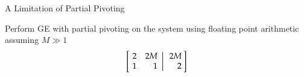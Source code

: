 \documentclass[10pt]{beamer}
\begin{document}
\begin{frame}{A Limitation of Partial Pivoting}
\begin{itemize}
\begin{example}    
Perform GE with partial pivoting on the system using floating point arithmetic assuming $M\gg1$  
    \begin{equation*}
        \left[\left.\negthickspace\begin{array}{rr}  2 &  2M\\
                                                        1 &  1\end{array}
               \right|\begin{array}{r} 2M \\ 2\end{array}\negthickspace\right]
    \end{equation*}
\end{example}


\end{itemize}
\end{frame}
\end{document}
